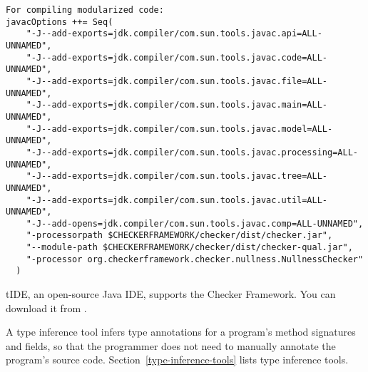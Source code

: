 
\begin{Verbatim}
For compiling modularized code:
javacOptions ++= Seq(
    "-J--add-exports=jdk.compiler/com.sun.tools.javac.api=ALL-UNNAMED",
    "-J--add-exports=jdk.compiler/com.sun.tools.javac.code=ALL-UNNAMED",
    "-J--add-exports=jdk.compiler/com.sun.tools.javac.file=ALL-UNNAMED",
    "-J--add-exports=jdk.compiler/com.sun.tools.javac.main=ALL-UNNAMED",
    "-J--add-exports=jdk.compiler/com.sun.tools.javac.model=ALL-UNNAMED",
    "-J--add-exports=jdk.compiler/com.sun.tools.javac.processing=ALL-UNNAMED",
    "-J--add-exports=jdk.compiler/com.sun.tools.javac.tree=ALL-UNNAMED",
    "-J--add-exports=jdk.compiler/com.sun.tools.javac.util=ALL-UNNAMED",
    "-J--add-opens=jdk.compiler/com.sun.tools.javac.comp=ALL-UNNAMED",
    "-processorpath $CHECKERFRAMEWORK/checker/dist/checker.jar",
    "--module-path $CHECKERFRAMEWORK/checker/dist/checker-qual.jar",
    "-processor org.checkerframework.checker.nullness.NullnessChecker"
  )
\end{Verbatim}



\begin{sloppypar}
tIDE, an open-source Java IDE, supports the Checker Framework.
You can download it from .
\end{sloppypar}



A type inference tool infers type annotations for a program's method
signatures and fields, so that the programmer does not need to manually
annotate the program's source code.  Section~\ref{type-inference-tools}
lists type inference tools.



